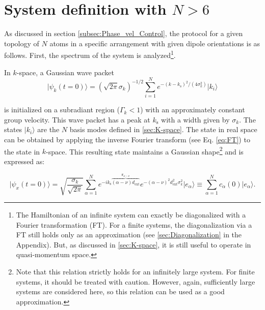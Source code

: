 \section{System definition with \texorpdfstring{$N > 6$}{N > 6}} \label{sec:Sys_def_N_bigger_6}
As discussed in section \ref{subsec:Phase_vel_Control},
the protocol for a given topology of $ N $ atoms in a specific arrangement with given dipole orientations is as follows.
First, the spectrum of the system is analyzed\footnote{The Hamiltonian of an infinite system can exactly be diagonalized with a Fourier transformation (FT).
For a finite systems, the diagonalization via a FT still holds only as an approximation (see \autoref{sec:Diagonalization} in the Appendix).
But, as discussed in \autoref{sec:K-space}, it is still useful to operate in quasi-momentum space.
}.

\noindent
In $k$-space, a Gaussian wave packet
\begin{equation}
    \vert \psi_k(t = 0) \rangle = (\sqrt{2 \pi}\sigma_k)^{-1/2} \sum_{i=1}^{N} e^{-(k-k_\text{s})^2/(4 \sigma_k^2)} \vert k_i \rangle
\end{equation}

\noindent
is initialized on a subradiant region ($\Gamma_k < 1$) with an approximately constant group velocity.
This wave packet has a peak at \( k_\text{s} \) with a width given by \( \sigma_k \).
The states $ \vert k_i \rangle $ are the $ N $ basis modes defined in \autoref{sec:K-space}.
The state in real space can be obtained by applying the inverse Fourier transform (see Eq. \eqref{eq:FT}) to the state in $k$-space.
This resulting state maintains a Gaussian shape\footnote{Note that this relation strictly holds for an infinitely large system.
For finite systems, it should be treated with caution.
However, again, sufficiently large systems are considered here, so this relation can be used as a good approximation.} and is expressed as:

\begin{equation} \label{eq:Initial_state}
\vert \psi_x(t = 0) \rangle = \sqrt{\frac{\sigma_k}{\sqrt{2 \pi}}} \sum_{\alpha=1}^{N} e^{-i k_\text{s} \overbrace{(\alpha - \nu)d_{\text{ext}}}^{\mathbf{r}_{\alpha-\nu}}} e^{-(\alpha - \nu)^2 d_{\text{ext}}^2\sigma_k^2} \vert e_\alpha \rangle \equiv \sum_{\alpha=1}^{N} c_{\alpha}(0) \vert e_\alpha \rangle.
\end{equation}

